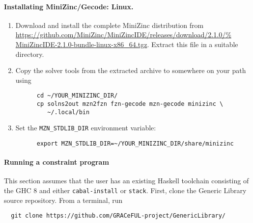 
\paragraph{Installating MiniZinc/Gecode: Linux.} 

\begin{enumerate}
  \item Download and install the complete MiniZinc distribution from
    \url{https://github.com/MiniZinc/MiniZincIDE/releases/download/2.1.0/%
    MiniZincIDE-2.1.0-bundle-linux-x86_64.tgz}. Extract this file in a suitable
    directory.
  \item Copy the solver tools from the extracted archive to somewhere on your
    path using

    \begin{verbatim}
      cd ~/YOUR_MINIZINC_DIR/
      cp solns2out mzn2fzn fzn-gecode mzn-gecode minizinc \
         ~/.local/bin
    \end{verbatim}

  \item Set the \verb+MZN_STDLIB_DIR+ environment variable:

    \begin{verbatim}
      export MZN_STDLIB_DIR=~/YOUR_MINIZINC_DIR/share/minizinc
    \end{verbatim}
\end{enumerate}


\paragraph{Running a constraint program} This section assumes that the user has
an existing Haskell toolchain consisting of the GHC 8 and either
\verb+cabal-install+ or \verb+stack+. First, clone the Generic Library source 
repository. From a terminal, run

\begin{verbatim}
  git clone https://github.com/GRACeFUL-project/GenericLibrary/
\end{verbatim}

